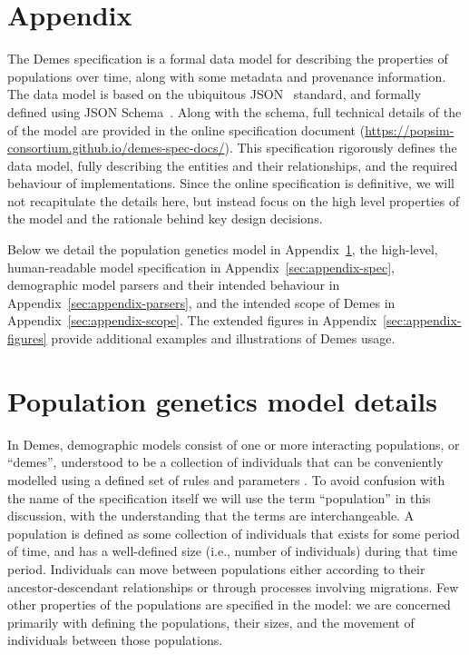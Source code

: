 \documentclass[11pt]{article}
\begin{document}



\renewcommand{\thefigure}{A\arabic{figure}}
\renewcommand{\thetable}{A\arabic{table}}
\renewcommand{\theequation}{A\arabic{equation}}
\renewcommand{\thesection}{A\arabic{section}}
\setcounter{figure}{0}
\setcounter{table}{0}
\setcounter{equation}{0}

\section*{Appendix}

The Demes specification is a formal data model for describing
the properties of populations over time,
along with some metadata and provenance information.
The data model is based on the ubiquitous JSON~\citep{bray2017javascript}
standard, and formally defined using
JSON Schema~\citep{wright2020json}.
Along with the schema, full technical details of the
of the model are provided in the
online specification document
(\url{https://popsim-consortium.github.io/demes-spec-docs/}).
This specification rigorously defines the data model,
fully describing the entities and their
relationships, and the required behaviour of implementations.
Since the online specification is definitive,
we will not recapitulate the details
here, but instead focus on the high level properties of the model and
the rationale behind key design decisions.

Below we detail the population genetics model in
Appendix~\ref{sec:appendix-pop-gen-model},
the high-level, human-readable model specification in
Appendix~\ref{sec:appendix-spec}, demographic model parsers and their
intended behaviour in Appendix~\ref{sec:appendix-parsers}, and the
intended scope of Demes in Appendix~\ref{sec:appendix-scope}.
The extended figures in Appendix~\ref{sec:appendix-figures} provide
additional examples and illustrations of Demes usage.

\section{Population genetics model details}
\label{sec:appendix-pop-gen-model}

In Demes, demographic models consist of one or more interacting populations,
or ``demes'', understood to be a collection of individuals that can be
conveniently modelled using a defined set of rules and parameters
\citep{gilmour_demes_1939,gilmour_deme_1955}.
To avoid confusion with the name of the specification itself we will
use the term ``population'' in this discussion, with the understanding that the
terms are interchangeable.
A population is defined as some collection of individuals that exists for
some period of time, and has a well-defined size (i.e., number of individuals)
during that time period. Individuals can move between populations
either according to their ancestor-descendant relationships
or through processes involving migrations.
Few other properties of the populations are specified in the model:
we are concerned primarily with defining the populations, their sizes, and the
movement of individuals between those populations.
\end{document}
